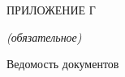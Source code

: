 \lstset{style=pythoninlinestyle}

%

\begin{center}
	ПРИЛОЖЕНИЕ Г
	
	\textit{(обязательное)}
\end{center}


\begin{center}
	Ведомость документов
\end{center}

